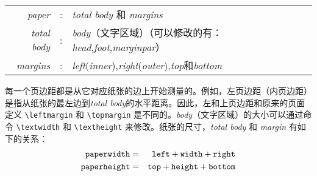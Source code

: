 \documentclass[titlepage]{ctexart}
\newcommand{\gpart}[1]{\textsf{\textsl{\color[rgb]{.0,.45,.7}#1}}}
\begin{document}
	\begin{center}
	\begin{tabular}{rcl}
	\gpart{paper} & : & \gpart{total body} 和 \gpart{margins}\\
	\gpart{total body} & : & \gpart{body}（文字区域）（可以修改的有：\gpart{head},\gpart{foot},\gpart{marginpar}）\\
	\gpart{margins} & : & \gpart{left}(\gpart{inner}),\gpart{right}(\gpart{outer}),\gpart{top}和\gpart{bottom}	
	\end{tabular}
	\end{center}
	每一个页边距都是从它对应纸张的边上开始测量的。例如，左页边距（内页边距）是指从纸张的最左边到\gpart{total body}的水平距离。因此，左和上页边距和原来的页面定义 \verb|\leftmargin| 和 \verb|\topmargin| 是不同的。\gpart{body}（文字区域）的大小可以通过命令 \verb|\textwidth| 和 \verb|\textheight| 来修改。纸张的尺寸，\gpart{total body} 和 \gpart{margin} 有如下的关系：
	\begin{eqnarray}
	\label{eq:paperwidth}
	\verb|paperwidth| &=& \verb|left|+\verb|width|+\verb|right|\\
	\verb|paperheight| &=& \verb|top|+\verb|height|+\verb|bottom| 
	\end{eqnarray}
	
\end{document}
